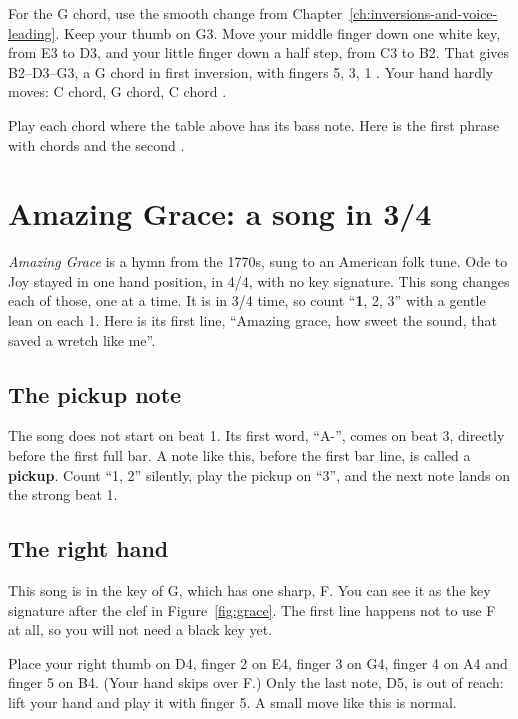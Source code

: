 For the G chord, use the smooth change from Chapter~\ref{ch:inversions-and-voice-leading}. Keep your thumb on G3. Move your middle finger down one white key, from E3 to D3, and your little finger down a half step, from C3 to B2. That gives B2--D3--G3, a G chord in first inversion, with fingers 5, 3, 1 . Your hand hardly moves: C chord, G chord, C chord .

Play each chord where the table above has its bass note. Here is the first phrase with chords  and the second .

\section{Amazing Grace: a song in 3/4}

\emph{Amazing Grace} is a hymn from the 1770s, sung to an American folk tune. Ode to Joy stayed in one hand position, in 4/4, with no key signature. This song changes each of those, one at a time. It is in 3/4 time, so count ``\textbf{1}, 2, 3'' with a gentle lean on each 1. Here is its first line, ``Amazing grace, how sweet the sound, that saved a wretch like me''.

\subsection*{The pickup note}

The song does not start on beat 1. Its first word, ``A-'', comes on beat 3, directly before the first full bar. A note like this, before the first bar line, is called a \textbf{pickup}. Count ``1, 2'' silently, play the pickup on ``3'', and the next note lands on the strong beat 1.

\subsection*{The right hand}

This song is in the key of G, which has one sharp, F\sh. You can see it as the key signature after the clef in Figure~\ref{fig:grace}. The first line happens not to use F at all, so you will not need a black key yet.

Place your right thumb on D4, finger 2 on E4, finger 3 on G4, finger 4 on A4 and finger 5 on B4. (Your hand skips over F\sh.) Only the last note, D5, is out of reach: lift your hand and play it with finger 5. A small move like this is normal.

